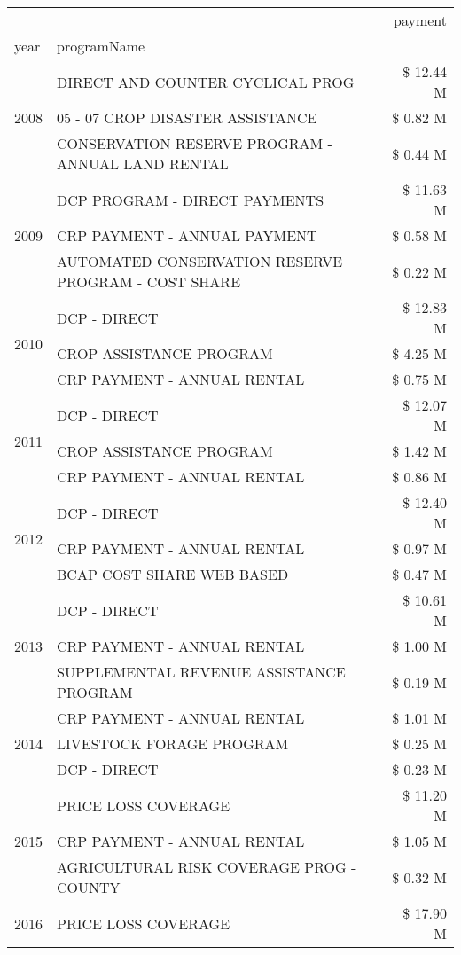 \begin{tabular}{llr}
\toprule
 &  & payment \\
year & programName &  \\
\midrule
\multirow[t]{3}{*}{2008} & DIRECT AND COUNTER CYCLICAL PROG & \$ 12.44 M \\
 & 05 - 07 CROP DISASTER ASSISTANCE & \$ 0.82 M \\
 & CONSERVATION RESERVE PROGRAM - ANNUAL LAND RENTAL & \$ 0.44 M \\
\cline{1-3}
\multirow[t]{3}{*}{2009} & DCP PROGRAM - DIRECT PAYMENTS & \$ 11.63 M \\
 & CRP PAYMENT - ANNUAL PAYMENT & \$ 0.58 M \\
 & AUTOMATED CONSERVATION RESERVE PROGRAM - COST SHARE & \$ 0.22 M \\
\cline{1-3}
\multirow[t]{3}{*}{2010} & DCP - DIRECT & \$ 12.83 M \\
 & CROP ASSISTANCE PROGRAM & \$ 4.25 M \\
 & CRP PAYMENT - ANNUAL RENTAL & \$ 0.75 M \\
\cline{1-3}
\multirow[t]{3}{*}{2011} & DCP - DIRECT & \$ 12.07 M \\
 & CROP ASSISTANCE PROGRAM & \$ 1.42 M \\
 & CRP PAYMENT - ANNUAL RENTAL & \$ 0.86 M \\
\cline{1-3}
\multirow[t]{3}{*}{2012} & DCP - DIRECT & \$ 12.40 M \\
 & CRP PAYMENT - ANNUAL RENTAL & \$ 0.97 M \\
 & BCAP COST SHARE WEB BASED & \$ 0.47 M \\
\cline{1-3}
\multirow[t]{3}{*}{2013} & DCP - DIRECT & \$ 10.61 M \\
 & CRP PAYMENT - ANNUAL RENTAL & \$ 1.00 M \\
 & SUPPLEMENTAL REVENUE ASSISTANCE PROGRAM & \$ 0.19 M \\
\cline{1-3}
\multirow[t]{3}{*}{2014} & CRP PAYMENT - ANNUAL RENTAL & \$ 1.01 M \\
 & LIVESTOCK FORAGE PROGRAM & \$ 0.25 M \\
 & DCP - DIRECT & \$ 0.23 M \\
\cline{1-3}
\multirow[t]{3}{*}{2015} & PRICE LOSS COVERAGE & \$ 11.20 M \\
 & CRP PAYMENT - ANNUAL RENTAL & \$ 1.05 M \\
 & AGRICULTURAL RISK COVERAGE PROG - COUNTY & \$ 0.32 M \\
\cline{1-3}
\multirow[t]{3}{*}{2016} & PRICE LOSS COVERAGE & \$ 17.90 M \\

\end{tabular}
